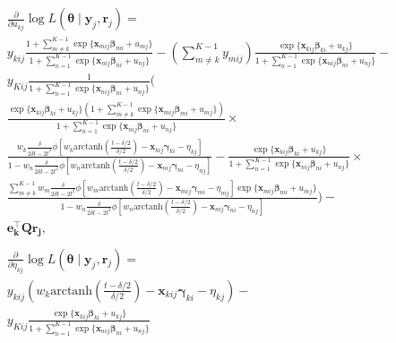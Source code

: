 \documentclass[12pt, %
               openright, %
               oneside, %
               a4paper, %
               chapter=TITLE, %
               section=TITLE, %
               brazil,
               english %
]{abntex2}
\begin{document}
\begin{apendicesenv}
\begin{align*}
  &\frac{\partial}{\partial u_{kj}}
    \log L(\bm{\theta}\mid\bm{y}_{j}, \bm{r}_{j}) =\\
  &y_{kij}\frac{1 +
    \sum_{m \neq k}^{K-1}\exp\{\bm{x}_{mij}\bm{\beta}_{mi} + u_{mj}\}
    }{1 +
    \sum_{n = 1}^{K-1}\exp\{\bm{x}_{nij}\bm{\beta}_{ni} + u_{nj}\}} -
    \left(\sum_{m \neq k}^{K-1} y_{mij}\right)
    \frac{\exp\{\bm{x}_{kij}\bm{\beta}_{ki} + u_{kj}\}
    }{1 +
    \sum_{n = 1}^{K-1}\exp\{\bm{x}_{nij}\bm{\beta}_{ni} + u_{nj}\}}-\\
  &y_{Kij}\frac{1}{1 +
    \sum_{n = 1}^{K-1}\exp\{\bm{x}_{nij}\bm{\beta}_{ni} + u_{nj}\}
    }\Bigg(\\
  &\frac{\exp\{\bm{x}_{kij}\bm{\beta}_{ki} + u_{kj}\}
    \left(1 +
    \sum_{m \neq k}^{K-1}\exp\{\bm{x}_{mij}\bm{\beta}_{mi} + u_{mj}\}
    \right)}{
    1 + \sum_{n = 1}^{K-1}\exp\{\bm{x}_{nij}\bm{\beta}_{ni} + u_{nj}\}
    }\times\\
  &\frac{w_{k}\frac{\delta}{2\delta t - 2t^{2}}
    \phi[w_{k}\text{arctanh}\left(\frac{t-\delta/2}{\delta/2}\right)
    - \bm{x}_{kij}\bm{\gamma}_{ki} - \eta_{kj}
    ]}{1 - w_{n}\frac{\delta}{2\delta t - 2t^{2}}
    \phi[w_{n}\text{arctanh}\left(\frac{t-\delta/2}{\delta/2}\right)
    - \bm{x}_{nij}\bm{\gamma}_{ni} - \eta_{nj}]} -
    \frac{\exp\{\bm{x}_{kij}\bm{\beta}_{ki} + u_{kj}\}}{
    1 + \sum_{n = 1}^{K-1}\exp\{\bm{x}_{nij}\bm{\beta}_{ni} + u_{nj}\}}
    \times\\
  &\frac{
    \sum_{m \neq k}^{K-1}
    w_{m}\frac{\delta}{2\delta t - 2t^{2}}
    \phi[w_{m}\text{arctanh}\left(\frac{t-\delta/2}{\delta/2}\right)
    - \bm{x}_{mij}\bm{\gamma}_{mi} - \eta_{mj}]
    \exp\{\bm{x}_{mij}\bm{\beta}_{mi} + u_{mj}\}}{
    1 - w_{n}\frac{\delta}{2\delta t - 2t^{2}}
    \phi[w_{n}\text{arctanh}\left(\frac{t-\delta/2}{\delta/2}\right)
    - \bm{x}_{nij}\bm{\gamma}_{ni} - \eta_{nj}]}\Bigg) -\\
  &\bm{e_{k}^{\top}Qr_{j}},\\
  \\
  &\frac{\partial}{\partial \eta_{kj}}
  \log L(\bm{\theta}\mid\bm{y}_{j}, \bm{r}_{j}) =\\
  &y_{kij} (w_{k}\text{arctanh}\left(\frac{t-\delta/2}{\delta/2}\right)
    - \bm{x}_{kij}\bm{\gamma}_{ki} - \eta_{kj}) -\\
  &y_{Kij}\frac{\exp\{\bm{x}_{kij}\bm{\beta}_{ki} + u_{kj}\}
    }{1 + \sum_{n = 1}^{K-1}\exp\{\bm{x}_{nij}\bm{\beta}_{ni} + u_{nj}\}}

\end{align*}
\end{apendicesenv}
\end{document}
